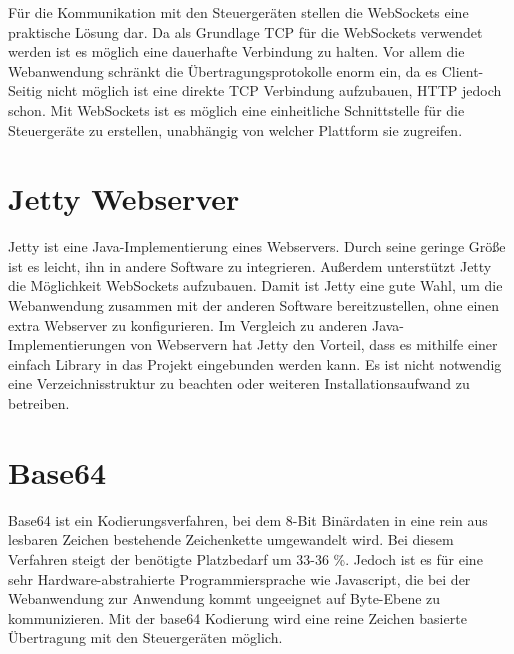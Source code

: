 Für die Kommunikation mit den Steuergeräten stellen die WebSockets eine praktische Lösung dar. Da als Grundlage TCP für die WebSockets verwendet werden ist es möglich eine dauerhafte Verbindung zu halten. Vor allem die Webanwendung schränkt die Übertragungsprotokolle enorm ein, da es Client-Seitig nicht möglich ist eine direkte TCP Verbindung aufzubauen, HTTP jedoch schon. Mit WebSockets ist es möglich eine einheitliche Schnittstelle für die Steuergeräte zu erstellen, unabhängig von welcher Plattform sie zugreifen.



\section{Jetty Webserver}
Jetty \cite{JETTY} ist eine Java-Implementierung eines Webservers. Durch seine geringe Größe ist es leicht, ihn in andere Software zu integrieren. Außerdem unterstützt Jetty die Möglichkeit WebSockets aufzubauen. Damit ist Jetty eine gute Wahl, um die Webanwendung zusammen mit der anderen Software bereitzustellen, ohne einen extra Webserver zu konfigurieren. Im Vergleich zu anderen Java-Implementierungen von Webservern hat Jetty den Vorteil, dass es mithilfe einer einfach Library in das Projekt eingebunden werden kann. Es ist nicht notwendig eine Verzeichnisstruktur zu beachten oder weiteren Installationsaufwand zu betreiben.



\section{Base64}
Base64 ist ein Kodierungsverfahren, bei dem 8-Bit Binärdaten in eine rein aus lesbaren Zeichen bestehende Zeichenkette umgewandelt wird. Bei diesem Verfahren steigt der benötigte Platzbedarf um 33-36 \%. Jedoch ist es für eine sehr Hardware-abstrahierte Programmiersprache wie Javascript, die bei der Webanwendung zur Anwendung kommt ungeeignet auf Byte-Ebene zu kommunizieren. Mit der base64 Kodierung wird eine reine Zeichen basierte Übertragung mit den Steuergeräten möglich.
